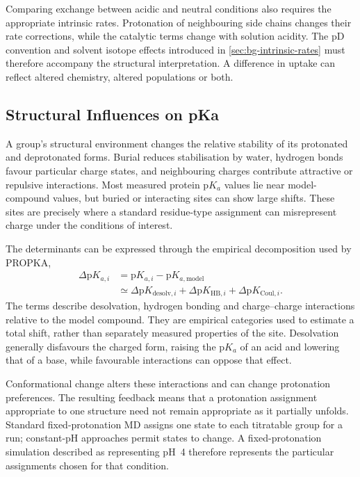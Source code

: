 Comparing exchange between acidic and neutral conditions also requires the appropriate intrinsic rates. Protonation of neighbouring side chains changes their rate corrections, while the catalytic terms change with solution acidity. The pD convention and solvent isotope effects introduced in \cref{sec:bg-intrinsic-rates} must therefore accompany the structural interpretation. A difference in uptake can reflect altered chemistry, altered populations or both.

\subsection{Structural Influences on pKa}
\label{sec:bg-pka-shifts}

A group's structural environment changes the relative stability of its protonated and deprotonated forms. Burial reduces stabilisation by water, hydrogen bonds favour particular charge states, and neighbouring charges contribute attractive or repulsive interactions. Most measured protein $\mathrm{p}K_a$ values lie near model-compound values, but buried or interacting sites can show large shifts.\supercite{grimsleySummaryMeasuredPK2009} These sites are precisely where a standard residue-type assignment can misrepresent charge under the conditions of interest.

The determinants can be expressed through the empirical decomposition used by PROPKA,
\begin{equation}
    \begin{split}
    \Delta\mathrm{p}K_{a,i}
    &=\mathrm{p}K_{a,i}-\mathrm{p}K_{a,\text{model}}\\
    &\simeq\Delta\mathrm{p}K_{\text{desolv},i}
    +\Delta\mathrm{p}K_{\text{HB},i}
    +\Delta\mathrm{p}K_{\text{Coul},i}.
    \end{split}
    \label{eq:bg-pka-shift}
\end{equation}
The terms describe desolvation, hydrogen bonding and charge--charge interactions relative to the model compound.\supercite{liVeryFastEmpirical2005,olssonPROPKA3ConsistentTreatment2011} They are empirical categories used to estimate a total shift, rather than separately measured properties of the site. Desolvation generally disfavours the charged form, raising the $\mathrm{p}K_a$ of an acid and lowering that of a base, while favourable interactions can oppose that effect.\supercite{grimsleySummaryMeasuredPK2009}

Conformational change alters these interactions and can change protonation preferences. The resulting feedback means that a protonation assignment appropriate to one structure need not remain appropriate as it partially unfolds. Standard fixed-protonation MD assigns one state to each titratable group for a run; constant-pH approaches permit states to change.\supercite{deoliveiraConstantPHMolecular2022} A fixed-protonation simulation described as representing pH~4 therefore represents the particular assignments chosen for that condition.

